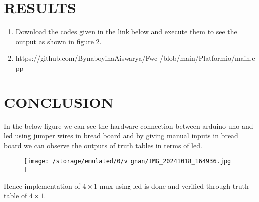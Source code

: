 \documentclass[conference]{IEEEtran}
\begin{document}
\section{RESULTS}
 \begin{enumerate}
\item Download the codes given in the link below and execute them to see the output as shown in figure 2.
\item https://github.com/BynaboyinaAiswarya/Fwc-/blob/main/Platformio/main.cpp
 \end{enumerate}
\section{CONCLUSION}
In the below figure we can see the hardware connection between arduino uno and led using jumper wires in bread board and by giving manual inputs in bread board we can observe the outputs of truth tables in terms of led. 
\begin{figure}[h] 
	\centering 
	\texttt{[image:  /storage/emulated/0/vignan/IMG\_20241018\_164936.jpg ]}
	\caption{\label{fig:Gates}}    
\end{figure}
Hence implementation of $4 \times 1$ mux using led is done and verified through truth table of $4 \times 1$.
\end{document}
